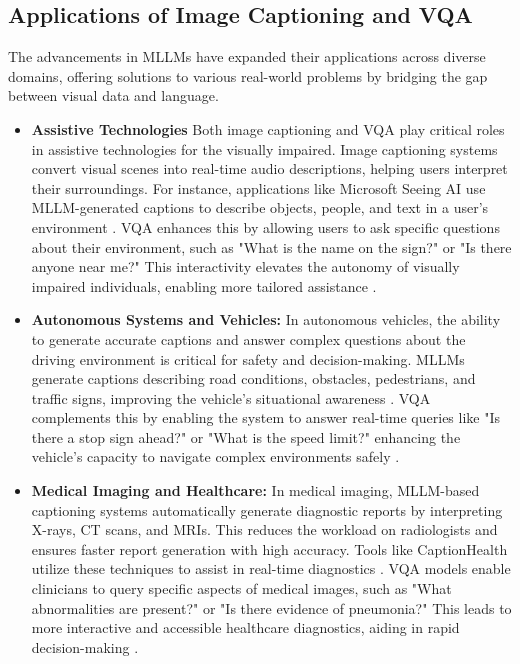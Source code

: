 \documentclass{article}
\begin{document}
\subsection{Applications of Image Captioning and VQA}

The advancements in MLLMs have expanded their applications across diverse domains, offering solutions to various real-world problems by bridging the gap between visual data and language.

\begin{itemize}
    \item \textbf{Assistive Technologies} Both image captioning and VQA play critical roles in assistive technologies for the visually impaired. Image captioning systems convert visual scenes into real-time audio descriptions, helping users interpret their surroundings. For instance, applications like Microsoft Seeing AI use MLLM-generated captions to describe objects, people, and text in a user's environment \cite{icmeta2021assistive}. VQA enhances this by allowing users to ask specific questions about their environment, such as "What is the name on the sign?" or "Is there anyone near me?" This interactivity elevates the autonomy of visually impaired individuals, enabling more tailored assistance \cite{assistive_vqa2020}.
    \item \textbf{Autonomous Systems and Vehicles:} In autonomous vehicles, the ability to generate accurate captions and answer complex questions about the driving environment is critical for safety and decision-making. MLLMs generate captions describing road conditions, obstacles, pedestrians, and traffic signs, improving the vehicle's situational awareness \cite{icmeta2020autonomous}. VQA complements this by enabling the system to answer real-time queries like "Is there a stop sign ahead?" or "What is the speed limit?" enhancing the vehicle's capacity to navigate complex environments safely \cite{autonomous_vqa2019}.
    
    \item \textbf{Medical Imaging and Healthcare:} In medical imaging, MLLM-based captioning systems automatically generate diagnostic reports by interpreting X-rays, CT scans, and MRIs. This reduces the workload on radiologists and ensures faster report generation with high accuracy. Tools like CaptionHealth utilize these techniques to assist in real-time diagnostics \cite{icmeta2021medical}. VQA models enable clinicians to query specific aspects of medical images, such as "What abnormalities are present?" or "Is there evidence of pneumonia?" This leads to more interactive and accessible healthcare diagnostics, aiding in rapid decision-making \cite{med_vqa2019, healthcare_vqa2021}.
    

\end{itemize}
\end{document}
